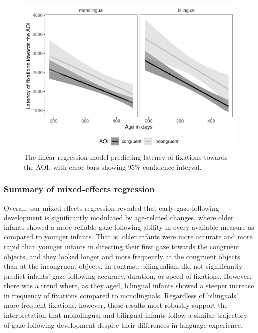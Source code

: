 \documentclass[
  english,
  ,man,floatsintext]{apa6}
\begin{document}
\begin{figure}
\centering
\includegraphics{gaze-following-paper_files/figure-latex/fig9-1.pdf}
\caption{\label{fig:fig9}The linear regression model predicting latency of fixations towards the AOI, with error bars showing 95\% confidence interval.}
\end{figure}

\hypertarget{summary-of-mixed-effects-regression}{%
\subsubsection{Summary of mixed-effects regression}\label{summary-of-mixed-effects-regression}}

Overall, our mixed-effects regression revealed that early gaze-following development is significantly modulated by age-related changes, where older infants showed a more reliable gaze-following ability in every available measure as compared to younger infants. That is, older infants were more accurate and more rapid than younger infants in directing their first gaze towards the congruent objects, and they looked longer and more frequently at the congruent objects than at the incongruent objects. In contrast, bilingualism did not significantly predict infants' gaze-following accuracy, duration, or speed of fixations. However, there was a trend where, as they aged, bilingual infants showed a steeper increase in frequency of fixations compared to monolinguals. Regardless of bilinguals' more frequent fixations, however, these results most robustly support the interpretation that monolingual and bilingual infants follow a similar trajectory of gaze-following development despite their differences in language experience.
\end{document}
